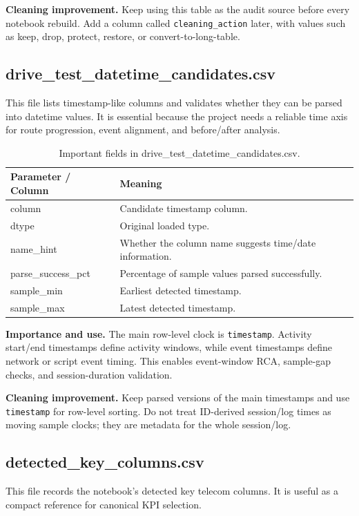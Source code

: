 \documentclass[12pt,a4paper]{article}
\begin{document}
\textbf{Cleaning improvement.} Keep using this table as the audit source before every notebook rebuild. Add a column called \texttt{cleaning\_action} later, with values such as keep, drop, protect, restore, or convert-to-long-table.


\subsection{drive\_test\_datetime\_candidates.csv}
This file lists timestamp-like columns and validates whether they can be parsed into datetime values. It is essential because the project needs a reliable time axis for route progression, event alignment, and before/after analysis.


\begin{table}[H]
\centering
\begin{tabularx}{\textwidth}{P{0.38\textwidth}Y}
\toprule
\textbf{Parameter / Column} & \textbf{Meaning} \\
\midrule
{\ttfamily column} & Candidate timestamp column. \\
{\ttfamily dtype} & Original loaded type. \\
{\ttfamily name\_\allowbreak{}hint} & Whether the column name suggests time/date information. \\
{\ttfamily parse\_\allowbreak{}success\_\allowbreak{}pct} & Percentage of sample values parsed successfully. \\
{\ttfamily sample\_\allowbreak{}min} & Earliest detected timestamp. \\
{\ttfamily sample\_\allowbreak{}max} & Latest detected timestamp. \\
\bottomrule
\end{tabularx}
\caption{Important fields in drive\_test\_datetime\_candidates.csv.}
\end{table}


\textbf{Importance and use.} The main row-level clock is \texttt{timestamp}. Activity start/end timestamps define activity windows, while event timestamps define network or script event timing. This enables event-window RCA, sample-gap checks, and session-duration validation.

\textbf{Cleaning improvement.} Keep parsed versions of the main timestamps and use \texttt{timestamp} for row-level sorting. Do not treat ID-derived session/log times as moving sample clocks; they are metadata for the whole session/log.


\subsection{detected\_key\_columns.csv}
This file records the notebook's detected key telecom columns. It is useful as a compact reference for canonical KPI selection.
\end{document}
